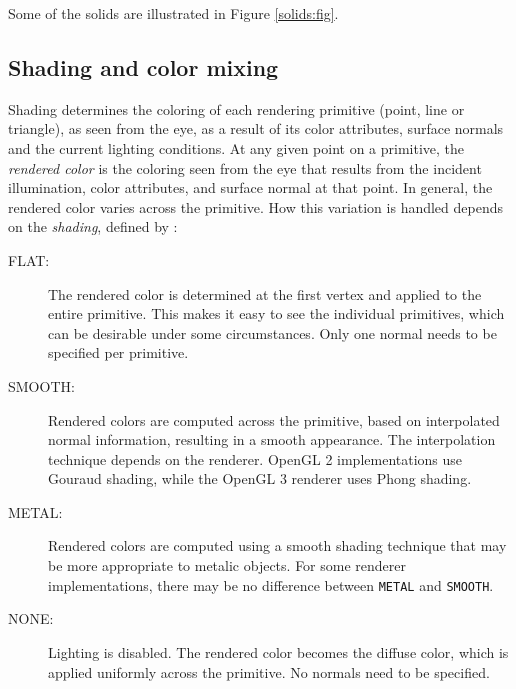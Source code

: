 Some of the solids are illustrated in Figure \ref{solids:fig}.

\subsection{Shading and color mixing}
\label{shading:sec}

Shading determines the coloring of each rendering primitive (point,
line or triangle), as seen from the eye, as a result of its color
attributes, surface normals and the current lighting conditions. At
any given point on a primitive, the {\it rendered color} is the
coloring seen from the eye that results from the incident
illumination, color attributes, and surface normal at that point. In
general, the rendered color varies across the primitive.  How this
variation is handled depends on the {\it shading}, defined by
:

%
\begin{description}

\item[FLAT:]\mbox{}

The rendered color is determined at the first vertex and applied to the
entire primitive. This makes it easy to see the individual primitives,
which can be desirable under some circumstances. Only one normal needs
to be specified per primitive.

\item[SMOOTH:]\mbox{}

Rendered colors are computed across the primitive, based on
interpolated normal information, resulting in a smooth appearance. The
interpolation technique depends on the renderer.  OpenGL 2
implementations use Gouraud shading, while the OpenGL 3 renderer uses
Phong shading.

\item[METAL:]\mbox{}

Rendered colors are computed using a smooth shading technique that may
be more appropriate to metalic objects. For some renderer
implementations, there may be no difference between {\tt METAL} and
{\tt SMOOTH}.

\item[NONE:]\mbox{}

Lighting is disabled. The rendered color becomes the diffuse color,
which is applied uniformly across the primitive. No normals need to be
specified.

\end{description}
%


